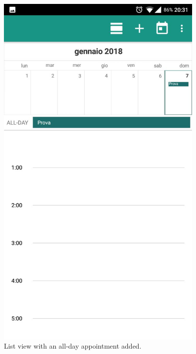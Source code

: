 \begin{figure}
	\centering
	\includegraphics[width=4in]{./screenshots/AndroidListView.jpg}
	\caption{List view with an all-day appointment added.}
	\label{fig:droidlistview}
\end{figure}

